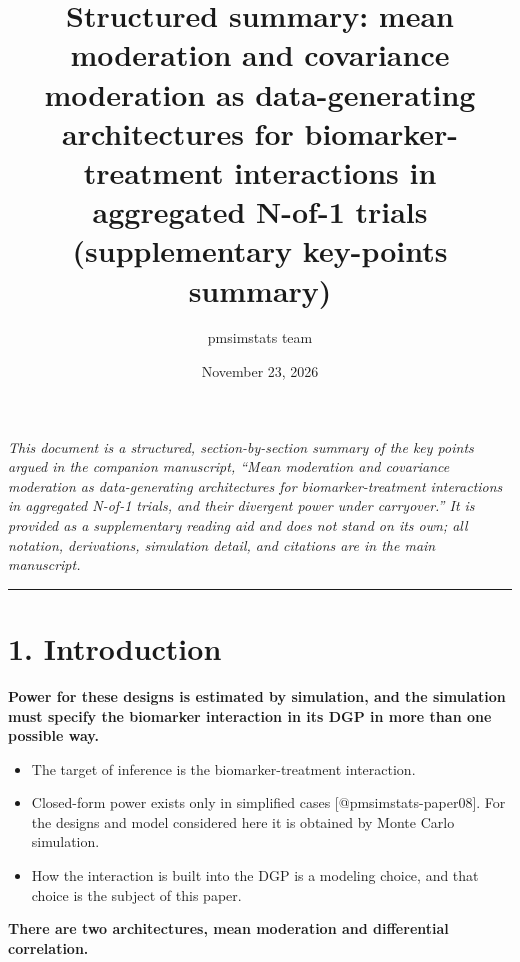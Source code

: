 \documentclass[
  11pt,
]{article}
\title{Structured summary: mean moderation and covariance moderation as data-generating architectures for biomarker-treatment interactions in aggregated N-of-1 trials (supplementary key-points summary)}
\author{pmsimstats team}
\date{November 23, 2026}
\begin{document}
\maketitle

{
\setcounter{tocdepth}{2}
\tableofcontents
}
\emph{This document is a structured, section-by-section summary of
the key points argued in the companion manuscript, ``Mean moderation
and covariance moderation as data-generating architectures for
biomarker-treatment interactions in aggregated N-of-1 trials, and
their divergent power under carryover.'' It is provided as a
supplementary reading aid and does not stand on its own; all
notation, derivations, simulation detail, and citations are in the
main manuscript.}


\bigskip\noindent

\rule{\textwidth}{0.4pt}\bigskip

\section{1. Introduction}

\textbf{Power for these designs is estimated by simulation, and the
simulation must specify the biomarker interaction in its DGP in
more than one possible way.}

\begin{itemize}\setlength{\itemsep}{2pt}\setlength{\parskip}{0pt}
\item The target of inference is the biomarker-treatment
interaction.
\item Closed-form power exists only in simplified cases
[@pmsimstats-paper08]. For the designs and model considered here it
is obtained by Monte Carlo simulation.
\item How the interaction is built into the DGP is a modeling
choice, and that choice is the subject of this paper.
\end{itemize}

\textbf{There are two architectures, mean moderation and
differential correlation.}
\end{document}
